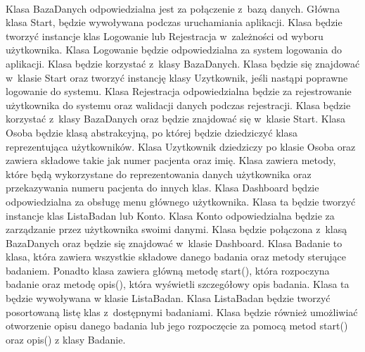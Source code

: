 \documentclass[12pt, letterpaper]{article}
\begin{document}
\paragraph{}
Klasa {\selectfont BazaDanych} odpowiedzialna jest za połączenie z~bazą danych. Główna klasa {\selectfont Start}, będzie wywoływana podczas uruchamiania aplikacji. Klasa będzie tworzyć instancje klas Logowanie lub Rejestracja w~zależności od wyboru użytkownika. Klasa {\selectfont Logowanie} będzie odpowiedzialna za system logowania do aplikacji. Klasa będzie korzystać z~klasy BazaDanych. Klasa będzie się znajdować w~klasie Start oraz tworzyć instancję klasy Uzytkownik, jeśli nastąpi poprawne logowanie do systemu. Klasa {\selectfont Rejestracja} odpowiedzialna będzie za rejestrowanie użytkownika do systemu oraz walidacji danych podczas rejestracji. Klasa będzie korzystać z~klasy BazaDanych oraz będzie znajdować się w~klasie Start. Klasa {\selectfont Osoba} będzie klasą abstrakcyjną, po której będzie dziedziczyć klasa reprezentująca użytkowników. Klasa {\selectfont Uzytkownik} dziedziczy po klasie Osoba oraz zawiera składowe takie jak numer pacjenta oraz imię. Klasa zawiera metody, które będą wykorzystane do reprezentowania danych użytkownika oraz przekazywania numeru pacjenta do innych klas. Klasa {\selectfont Dashboard} będzie odpowiedzialna za obsługę menu głównego użytkownika. Klasa ta będzie tworzyć instancje klas ListaBadan lub Konto. Klasa {\selectfont Konto} odpowiedzialna będzie za zarządzanie przez użytkownika swoimi danymi. Klasa będzie połączona z~klasą BazaDanych oraz będzie się znajdować w~klasie Dashboard. Klasa {\selectfont Badanie} to klasa, która zawiera wszystkie składowe danego badania oraz metody sterujące badaniem. Ponadto klasa zawiera główną metodę start(), która rozpoczyna badanie oraz metodę opis(), która wyświetli szczegółowy opis badania. Klasa ta będzie wywoływana w klasie ListaBadan. Klasa {\selectfont ListaBadan} będzie tworzyć posortowaną listę klas z~dostępnymi badaniami. Klasa będzie również umożliwiać otworzenie opisu danego badania lub jego rozpoczęcie za pomocą metod start() oraz opis() z klasy Badanie.\\
		
\end{document}
